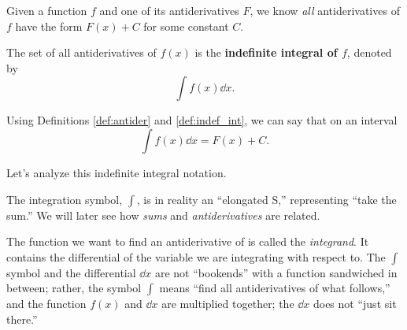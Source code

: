 Given a function $f$ and one of its antiderivatives $F$, we know \emph{all} antiderivatives of $f$ have the form $F(x) + C$ for some constant $C$.

\begin{definition}\label{def:indef_int}
The set of all antiderivatives of $f(x)$ is the \textbf{indefinite integral of $f$}, denoted by
\[\int f(x) \dd x.\]
\end{definition}

Using Definitions \ref{def:antider} and \ref{def:indef_int}, we can say that on an interval
\[\int f(x) \dd x = F(x) + C.\]

Let's analyze this indefinite integral notation.
%
\begin{center}
\end{center}
%
The integration symbol, $\int$, is in reality an ``elongated S,'' representing ``take the sum.'' We will later see how \emph{sums} and \emph{antiderivatives} are related.

The function we want to find an antiderivative of is called the \emph{integrand}. It contains the differential of the variable we are integrating with respect to. The $\int$ symbol and the differential $\dd x$ are not ``bookends'' with a function sandwiched in between; rather, the symbol $\int$ means ``find all antiderivatives of what follows,'' and the function $f(x)$ and $\dd x$ are multiplied together; the $\dd x$ does not ``just sit there.''

